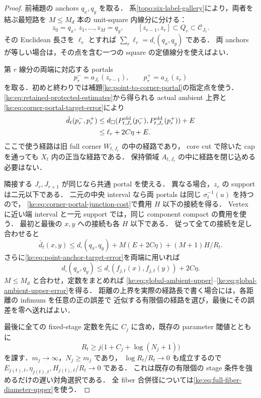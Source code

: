 \begin{proof}
前補題の anchors $q_x,q_y$ を取る．
系\ref{topo:six-label-gallery}により，両者を結ぶ最短路を
$M\le M_d$ 本の unit-square 内線分に分ける：
\[
 z_0=q_x,\ z_1,\ldots,z_M=q_y,
 \qquad[z_{r-1},z_r]\subset Q_r\subset\mathcal C_{J_r}.
\]
その Euclidean 長さを $\ell_r$ とすれば
$\sum_r\ell_r=d_\square(q_x,q_y)$ である．
両 anchors が等しい場合は，その点を含む一つの square の定値線分を使えばよい．

第 $r$ 線分の両端に対応する portals
\[
 p_r^-=a_{J_r}(z_{r-1}),\qquad p_r^+=a_{J_r}(z_r)
\]
を取る．初めと終わりでは補題\ref{ke:point-to-corner-portal}の指定点を使う．
\eqref{ke:eq:retained-protected-estimates}から得られる actual ambient 上界と
\eqref{ke:eq:corner-portal-target-error}により
\begin{align*}
 \bar d_t(p_r^-,p_r^+)
 &\le d_\square(P^{\rm old}_{t,J_r}(p_r^-),
                         P^{\rm old}_{t,J_r}(p_r^+))+E\\
 &\le \ell_r+2C\eta+E .
\end{align*}
ここで使う経路は旧 full corner $W_{t,J_r}$ の中の経路であり，
core cut で除いた cap を通っても $X_t$ 内の正当な経路である．
保持領域 $A_{t,J_r}$ の中に経路を閉じ込める必要はない．

隣接する $J_r,J_{r+1}$ が同じなら共通 portal を使える．
異なる場合，$z_r$ の support は二元以下である．
二元の中央 interval なら両 portals は同じ $\sigma_t^{-1}(u)$ を持つので，
\eqref{ke:eq:corner-portal-junction-cost}で費用 $H$ 以下の接続を得る．
Vertex に近い端 interval と一元 support では，同じ component compact の費用を使う．
最初と最後の $x,y$ への接続も各 $H$ 以下である．
従って全ての接続を足し合わせると
\[
 \bar d_t(x,y)
 \le d_\square(q_x,q_y)+M(E+2C\eta)+(M+1)H/R_t.
\]
さらに\eqref{ke:eq:point-anchor-target-error}を両端に用いれば
\[
 d_\square(q_x,q_y)
 \le d_\square(f_{j,t}(x),f_{j,t}(y))+2C\eta .
\]
$M\le M_d$ と合わせ，定数をまとめれば
\eqref{ke:eq:global-ambient-upper}--\eqref{ke:eq:global-ambient-upper-error}を得る．
距離の上界を実際の経路長で書く場合には，各距離の infimum を任意の正の誤差で
近似する有限個の経路を選び，最後にその誤差を零へ送ればよい．

最後に全ての fixed-stage 定数を先に $C_j$ に含め，既存の parameter 閾値とともに
\[
 R_t\ge j\bigl(1+C_j+\log(N_j+1)\bigr)
\]
を課す．$m_j\to\infty$，$N_j\ge m_j$ であり，
$\log R_t/R_t\to0$ も成立するので
$E_{j(t),t},\eta_{j(t),t},H_{j(t),t}/R_t\to0$ である．
これは既存の有限個の stage 条件を強めるだけの遅い対角選択である．
全 fiber 合併径については\eqref{ke:eq:full-fiber-diameter-upper}を使う．
\end{proof}

